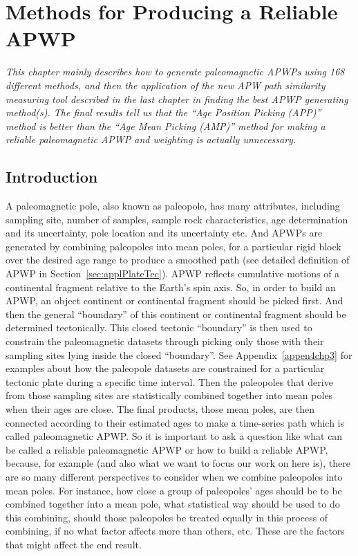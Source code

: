 \chapter{Methods for Producing a Reliable APWP}\label{chap:Reliab}  %
\textit{This chapter mainly describes how to generate paleomagnetic APWPs using
168 different methods, and then the application of the new APW path similarity
measuring tool described in the last chapter in finding the best APWP generating
method(s). The final results tell us that the ``Age Position Picking (APP)''  %
method is better than the ``Age Mean Picking (AMP)'' method for making a
reliable paleomagnetic APWP and weighting is actually unnecessary.}
\vfill
\minitoc\newpage

\section{Introduction}

A paleomagnetic pole, also known as paleopole, has many attributes, including
sampling site, number of samples, sample rock characteristics, age determination
and its uncertainty, pole location and its uncertainty etc. And APWPs are
generated by combining paleopoles into mean poles, for a particular rigid block
over the desired age range to produce a smoothed path (see detailed definition
of APWP in Section~\ref{sec:applPlateTec}). APWP reflects cumulative motions of
a continental fragment relative to the Earth's spin axis. So, in order to build
an APWP, an object continent or continental fragment should be picked first. And
then the general ``boundary'' of this continent or continental fragment should
be determined tectonically. This closed tectonic ``boundary'' is then used to
constrain the paleomagnetic datasets through picking only those with their
sampling sites lying inside the closed ``boundary''. See
Appendix~\ref{appen4chp3}
for examples about how the paleopole datasets are constrained for a particular
tectonic plate during a specific time interval. Then the paleopoles that derive
from those sampling sites are statistically combined together into mean poles
when their ages are close. The final products, those mean poles, are then
connected according to their estimated ages to make a time-series path which is
called paleomagnetic APWP\@. So it is important to ask a question like what can
be called a reliable paleomagnetic APWP or how to build a reliable APWP,
because, for example (and also what we want to focus our work on here is), there
are so many different perspectives to consider when we combine paleopoles into
mean poles. For instance, how close a group of paleopoles' ages should be to be
combined together into a mean pole, what statistical way should be used to do
this combining, should those paleopoles be treated equally in this process of
combining, if no what factor affects more than others, etc. These are the
factors that might affect the end result.

